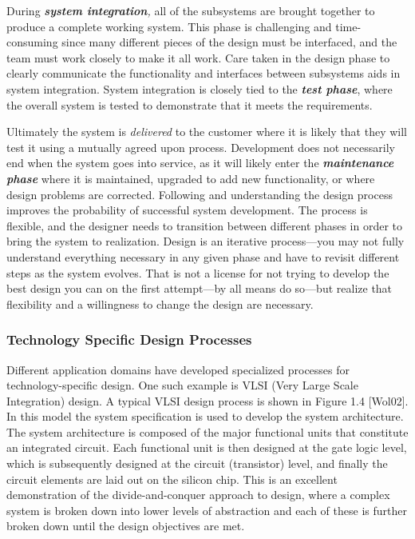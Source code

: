 During \emph{\textbf{system integration},} all of the subsystems are
brought together to produce a complete working system. This phase is
challenging and time-consuming since many different pieces of the design
must be interfaced, and the team must work closely to make it all work.
Care taken in the design phase to clearly communicate the functionality
and interfaces between subsystems aids in system integration. System
integration is closely tied to the \emph{\textbf{test phase}}, where the
overall system is tested to demonstrate that it meets the requirements.

Ultimately the system is \emph{delivered} to the customer where it is
likely that they will test it using a mutually agreed upon process.
Development does not necessarily end when the system goes into service,
as it will likely enter the \emph{\textbf{maintenance phase}} where it
is maintained, upgraded to add new functionality, or where design
problems are corrected. Following and understanding the design process
improves the probability of successful system development. The process
is flexible, and the designer needs to transition between different
phases in order to bring the system to realization. Design is an
iterative process---you may not fully understand everything necessary in
any given phase and have to revisit different steps as the system
evolves. That is not a license for not trying to develop the best design
you can on the first attempt---by all means do so---but realize that
flexibility and a willingness to change the design are necessary.

\subsubsection{Technology Specific Design
Processes}\label{technology-specific-design-processes}

Different application domains have developed specialized processes for
technology-specific design. One such example is VLSI (Very Large Scale
Integration) design. A typical VLSI design process is shown in Figure
1.4 {[}Wol02{]}. In this model the system specification is used to
develop the system architecture. The system architecture is composed of
the major functional units that constitute an integrated circuit. Each
functional unit is then designed at the gate logic level, which is
subsequently designed at the circuit (transistor) level, and finally the
circuit elements are laid out on the silicon chip. This is an excellent
demonstration of the divide-and-conquer approach to design, where a
complex system is broken down into lower levels of abstraction and each
of these is further broken down until the design objectives are met.

